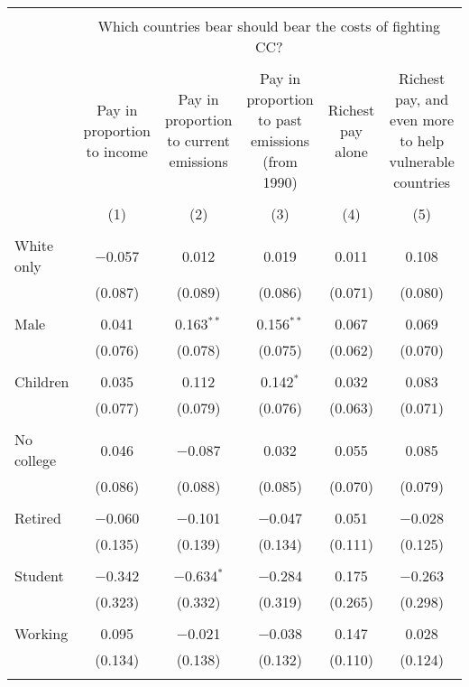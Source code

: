 
\begin{tabular}{@{\extracolsep{5pt}}lccccc} 
\\[-1.8ex]\hline 
\hline \\[-1.8ex] 
 & \multicolumn{5}{c}{Which countries bear should bear the costs of fighting CC?} \\ 
\cline{2-6} 
\\[-1.8ex] & Pay in proportion to income & Pay in proportion to current emissions & Pay in proportion to past emissions (from 1990) & Richest pay alone & Richest pay, and even more to help vulnerable countries \\ 
\\[-1.8ex] & (1) & (2) & (3) & (4) & (5)\\ 
\hline \\[-1.8ex] 
 White only & $-$0.057 & 0.012 & 0.019 & 0.011 & 0.108 \\ 
  & (0.087) & (0.089) & (0.086) & (0.071) & (0.080) \\ 
  & & & & & \\ 
 Male & 0.041 & 0.163$^{**}$ & 0.156$^{**}$ & 0.067 & 0.069 \\ 
  & (0.076) & (0.078) & (0.075) & (0.062) & (0.070) \\ 
  & & & & & \\ 
 Children & 0.035 & 0.112 & 0.142$^{*}$ & 0.032 & 0.083 \\ 
  & (0.077) & (0.079) & (0.076) & (0.063) & (0.071) \\ 
  & & & & & \\ 
 No college & 0.046 & $-$0.087 & 0.032 & 0.055 & 0.085 \\ 
  & (0.086) & (0.088) & (0.085) & (0.070) & (0.079) \\ 
  & & & & & \\ 
 Retired & $-$0.060 & $-$0.101 & $-$0.047 & 0.051 & $-$0.028 \\ 
  & (0.135) & (0.139) & (0.134) & (0.111) & (0.125) \\ 
  & & & & & \\ 
 Student & $-$0.342 & $-$0.634$^{*}$ & $-$0.284 & 0.175 & $-$0.263 \\ 
  & (0.323) & (0.332) & (0.319) & (0.265) & (0.298) \\ 
  & & & & & \\ 
 Working & 0.095 & $-$0.021 & $-$0.038 & 0.147 & 0.028 \\ 
  & (0.134) & (0.138) & (0.132) & (0.110) & (0.124) \\ 
  & & & & & \\ 

\end{tabular}
